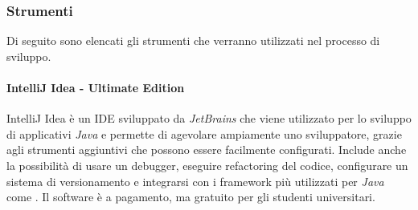

		\subsubsection{Strumenti}
			Di seguito sono elencati gli strumenti che verranno utilizzati nel processo di sviluppo.
							
				\paragraph{IntelliJ Idea - Ultimate Edition}
					IntelliJ Idea è un IDE sviluppato da \textit{JetBrains} che viene utilizzato per lo sviluppo di applicativi \textit{Java} e permette di agevolare ampiamente uno sviluppatore, grazie agli strumenti aggiuntivi che possono essere facilmente configurati. Include anche la possibilità di usare un debugger, eseguire refactoring del codice, configurare un sistema di versionamento e integrarsi con i framework più utilizzati per \textit{Java} come . Il software è a pagamento, ma gratuito per gli studenti universitari. 

